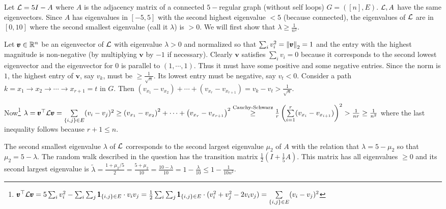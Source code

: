\soln

Let ${\mathcal{L}} = 5I-A$ where $A$ is the adjacency matrix of a connected $5-$regular graph (without self loops) $G=([n],E)$. ${\mathcal{L}},A$ have the same eigenvectors. Since $A$ has eigenvalues in $[-5,5]$ with the second highest eigenvalue $<5$ (because connected), the eigenvalues of ${\mathcal{L}}$ are in $[0,10]$ where the second smallest eigenvalue (call it $\lambda$) is $>0$. We will first show that $\lambda \ge \frac1{n^{2}}$.

Let $\pmb v\in\mathbb{R}^{n}$ be an eigenvector of ${\mathcal{L}}$ with eigenvalue $\lambda>0$ and normalized so that $\sum_{i}v_{i}^{2}=\left\lVert \pmb v \right\rVert_{2}=1$ and the entry with the highest magnitude is non-negative (by multiplying $\pmb v$ by $-1$ if necessary). Clearly $\pmb v$ satisfies $\sum_{i}v_{i}=0$ because it corresponds to the second lowest eigenvector and the eigenvector for $0$ is parallel to $(1,\cdots,1)$. Thus it must have some positive and some negative entries. Since the norm is $1$, the highest entry of $\pmb v$, say $v_{k}$, must be $\ge \frac{1}{\sqrt n}$. Its lowest entry must be negative, say $v_{t}<0$. Consider a path $k = x_{1} \to x_{2}\to\cdots\to x_{r+1} = t$ in $G$. Then $\left(v_{x_{1}} - v_{x_{2}}\right) +\cdots + \left(v_{x_{r}} - v_{x_{r+1}}\right) = v_{k} - v_{t} > \frac{1}{\sqrt n}$.

Now\footnote{$\pmb v^{\top}{\mathcal{L}}\pmb v = 5\sum_{i}v_{i}^{2} - \sum_{i}\sum_{j}\pmb 1_{\left\{i,j\right\}\in E}\cdot v_{i}v_{j} = \frac12\sum_{i}\sum_{j}\pmb 1_{\left\{i,j\right\}\in E}\cdot(v_{i}^{2}+v_{j}^{2}-2v_{i}v_{j}) = \sum\limits_{\left\{i,j\right\}\in E} (v_{i}-v_{j})^{2}$} $\lambda = \pmb v^{\top}{\mathcal{L}}\pmb v = \sum\limits_{\left\{i,j\right\}\in E} (v_{i}-v_{j})^{2} \ge \left(v_{x_{1}} - v_{x_{2}}\right)^{2} +\cdots + \left(v_{x_{r}} - v_{x_{r+1}}\right)^{2} \stackrel{\text{Cauchy-Schwarz}}{\ge} \\\frac{1}{r} \left(\sum\limits_{i=1}^{r}(v_{x_{i}} - v_{x_{i+1}})\right)^{2} > \frac{1}{nr} \ge \frac{1}{n^{2}}$ where the last inequality follows because $r+1\le n$. 

The second smallest eigenvalue $\lambda$ of ${\mathcal{L}}$ corresponds to the second largest eigenvalue $\mu_{2}$ of $A$ with the relation that $\lambda=5-\mu_{2}$ so that $\mu_{2} = 5-\lambda$. The random walk described in the question has the transition matrix $\frac{1}2\left(I+\frac15A\right)$. This matrix has all eigenvalues $\ge 0$ and its second largest eigenvalue is $\tilde\lambda = \frac{1+\mu_{2}/5}{2} = \frac{5+\mu_{2}}{10} = \frac{10-\lambda}{10} = 1-\frac{\lambda}{10} \le 1-\frac{1}{10n^{2}}$.




